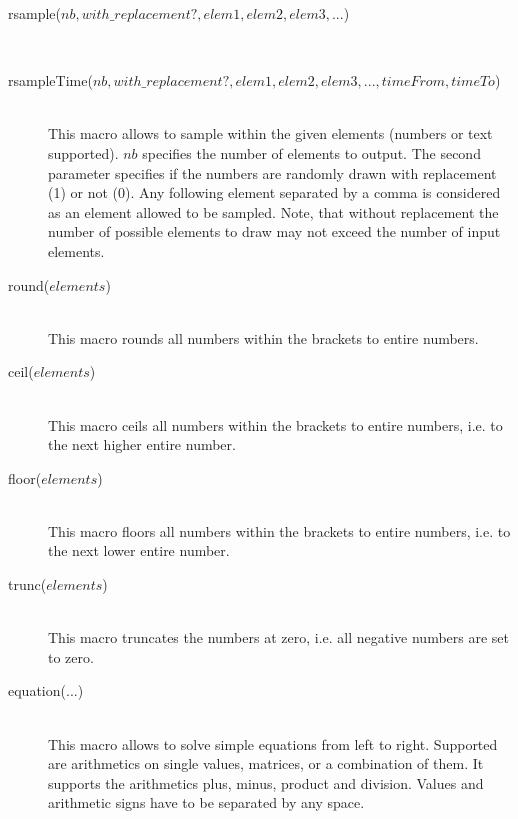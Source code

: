 \documentclass[letterpaper,12pt,oneside]{book}
\begin{document}
\begin{description}
\item[rsample($nb, with\_replacement?, elem1, elem2, elem3, ...$)]\hspace*{\fill}\\
\vspace{-9mm}
\item[rsampleTime($nb, with\_replacement?, elem1, elem2, elem3, ..., timeFrom, timeTo$)]\hspace*{\fill}\\
This macro allows to sample within the given elements (numbers or text supported). $nb$ specifies the number of elements to output. The second parameter specifies if the numbers are randomly drawn with replacement (1) or not (0). Any following element separated by a comma  is considered as an element allowed to be sampled. Note, that without replacement the number of possible elements to draw may not exceed the number of input elements.

\item[round($elements$)]\hspace*{\fill}\\
This macro rounds all numbers within the brackets to entire numbers.

\item[ceil($elements$)]\hspace*{\fill}\\
This macro ceils all numbers within the brackets to entire numbers, i.e. to the next higher entire number.

\item[floor($elements$)]\hspace*{\fill}\\
This macro floors all numbers within the brackets to entire numbers, i.e. to the next lower entire number.

\item[trunc($elements$)]\hspace*{\fill}\\
This macro truncates the numbers at zero, i.e. all negative numbers are set to zero.

\item[equation($...$)]\hspace*{\fill}\\
This macro allows to solve simple equations from left to right. Supported are arithmetics on single values, matrices, or a combination of them. It supports the arithmetics plus, minus, product and division. Values and arithmetic signs have to be separated by any space.

\end{description}
\end{document}
